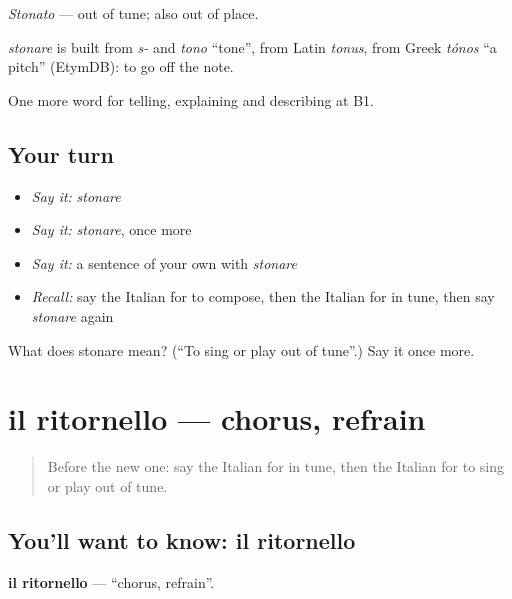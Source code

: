 \emph{Stonato} — out of tune; also out of place.

\begin{cousinweb}
\emph{stonare} is built from \emph{s-} and \emph{tono} \textquotedblleft{}tone\textquotedblright{}, from Latin \emph{tonus}, from Greek \emph{tónos} \textquotedblleft{}a pitch\textquotedblright{} (EtymDB): to go off the note.
\end{cousinweb}

\begin{grammarlens}[title={What you've built}]
One more word for telling, explaining and describing at B1.
\end{grammarlens}

\subsection*{Your turn}
\begin{itemize}
\raggedright
  \item \emph{Say it:} \emph{stonare}
  \item \emph{Say it:} \emph{stonare}, once more
  \item \emph{Say it:} a sentence of your own with \emph{stonare}
  \item \emph{Recall:} say the Italian for to compose, then the Italian for in tune, then say \emph{stonare} again
\end{itemize}

\begin{tcolorbox}[breakable,colback=teal!4,colframe=teal!35!black,title={Before you move on}]
What does stonare mean? (\textquotedblleft{}To sing or play out of tune\textquotedblright{}.) Say it once more.
\end{tcolorbox}
\section[il ritornello]{il ritornello — chorus, refrain}

\label{lesson:IT-C518-ritornello}



\begin{quote}
Before the new one: say the Italian for in tune, then the Italian for to sing or play out of tune.
\end{quote}

\subsection*{You'll want to know: il ritornello}
\textbf{il ritornello} — \textquotedblleft{}chorus, refrain\textquotedblright{}.

